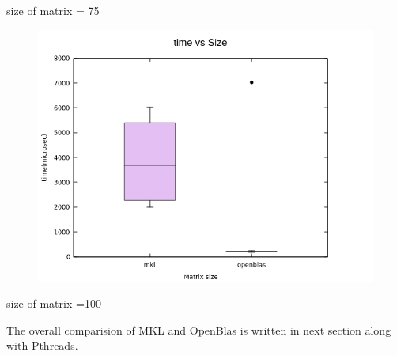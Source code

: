 \documentclass[14pt]{extarticle}
\begin{document}
size of matrix = 75
\newpage
\begin{figure}[t]
\centering
\includegraphics[width=16cm]{100x3.png}
\end{figure}
size of matrix =100
\newpage


The overall comparision of MKL and OpenBlas is written in next section along with Pthreads.
\end{document}
